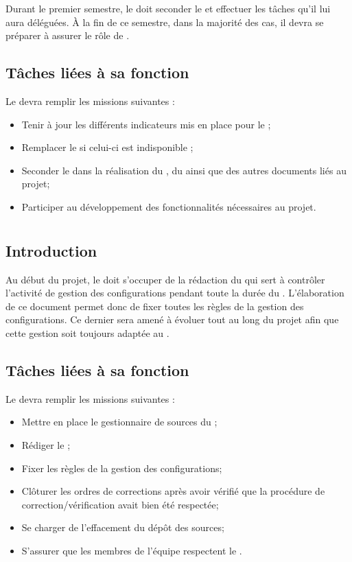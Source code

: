 Durant le premier semestre, le \RQA{} doit seconder le \RQ{} et effectuer les tâches qu’il lui aura déléguées. À la fin de ce semestre, dans la majorité des cas, il devra se préparer à assurer le rôle de \RQ .

\subsection*{Tâches liées à sa fonction}

Le \RQA{} devra remplir les missions suivantes :
\begin{itemize}
	\item Tenir à jour les différents indicateurs mis en place pour le \PICCourt;
	\item Remplacer le \RQA{} si celui-ci est indisponible ;
	\item Seconder le \RQ{} dans la réalisation du \PQ, du \PGC{} ainsi que des autres documents liés au projet;
        \item Participer au développement des fonctionnalités nécessaires au projet. 
\end{itemize}

\newpage
\section{\RGC}
\subsection*{Introduction}

Au début du projet, le \RGC{} doit s'occuper de la rédaction du \PGCCourt{} qui sert à contrôler l’activité de gestion des configurations pendant toute la durée du \PICCourt. L’élaboration de ce document permet donc de fixer toutes les règles de la gestion des configurations. Ce dernier sera amené à évoluer tout au long du projet afin que cette gestion soit toujours adaptée au \PICCourt.

\subsection*{Tâches liées à sa fonction}

Le \RGC{} devra remplir les missions suivantes :
\begin{itemize}
	\item Mettre en place le gestionnaire de sources du \PICCourt;
	\item Rédiger le \PGC;
	\item Fixer les règles de la gestion des configurations;
        \item Clôturer les ordres de corrections après avoir vérifié que la procédure de correction/vérification avait bien été respectée;
        \item Se charger de l'effacement du dépôt des sources;
        \item S'assurer que les membres de l'équipe \PICCourt{} respectent le \PGCCourt.
\end{itemize}

